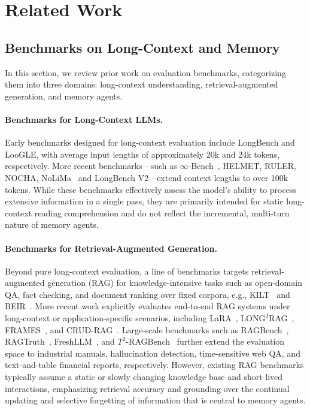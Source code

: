 \section{Related Work}

\subsection{Benchmarks on Long-Context and Memory} 

In this section, we review prior work on evaluation benchmarks, categorizing them into three domains: long-context understanding, retrieval-augmented generation, and memory agents. 

\vspace{-10pt}

\paragraph{Benchmarks for Long-Context LLMs.} Early benchmarks designed for long-context evaluation include LongBench\citep{longbench} and LooGLE\citep{LooGLE}, with average input lengths of approximately 20k and 24k tokens, respectively. More recent benchmarks—such as $\infty$-Bench~\citep{infinitebench}, HELMET\citep{HELMET}, RULER\citep{RULER}, NOCHA\citep{nocha}, NoLiMa~\citep{nolima} and LongBench V2\citep{longbenchv2}—extend context lengths to over 100k tokens. While these benchmarks effectively assess the model's ability to process extensive information in a single pass, they are primarily intended for static long-context reading comprehension and do not reflect the incremental, multi-turn nature of memory agents.


\paragraph{Benchmarks for Retrieval-Augmented Generation.}
Beyond pure long-context evaluation, a line of benchmarks targets retrieval-augmented generation (RAG) for knowledge-intensive tasks such as open-domain QA, fact checking, and document ranking over fixed corpora, e.g., KILT~\citep{kilt} and BEIR~\citep{beir}. 
More recent work explicitly evaluates end-to-end RAG systems under long-context or application-specific scenarios, including LaRA~\citep{lara}, LONG$^2$RAG~\citep{LONG2RAG}, FRAMES~\citep{FRAMES}, and CRUD-RAG~\citep{Crud-rag}. Large-scale benchmarks such as RAGBench~\citep{ragbench}, RAGTruth~\citep{ragtruth}, FreshLLM~\citep{freshllms}, and $T^2$-RAGBench~\citep{t2ragbench} further extend the evaluation space to industrial manuals, hallucination detection, time-sensitive web QA, and text-and-table financial reports, respectively.
However, existing RAG benchmarks typically assume a static or slowly changing knowledge base and short-lived interactions, emphasizing retrieval accuracy and grounding over the continual updating and selective forgetting of information that is central to memory agents. 



